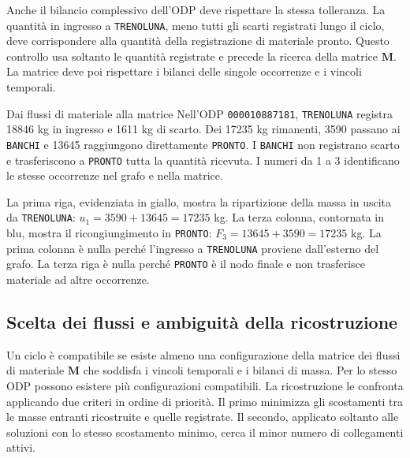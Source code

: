 Anche il bilancio complessivo dell'ODP deve rispettare la stessa tolleranza. La quantità in ingresso a \texttt{TRENOLUNA}, meno tutti gli scarti registrati lungo il ciclo, deve corrispondere alla quantità della registrazione di materiale pronto. Questo controllo usa soltanto le quantità registrate e precede la ricerca della matrice $\bm{M}$. La matrice deve poi rispettare i bilanci delle singole occorrenze e i vincoli temporali.

\begin{examplebox}{Dai flussi di materiale alla matrice}
Nell'ODP \texttt{000010887181}, \texttt{TRENOLUNA} registra \num{18846} kg in ingresso e \num{1611} kg di scarto. Dei \num{17235} kg rimanenti, \num{3590} passano ai \texttt{BANCHI} e \num{13645} raggiungono direttamente \texttt{PRONTO}. I \texttt{BANCHI} non registrano scarto e trasferiscono a \texttt{PRONTO} tutta la quantità ricevuta. I numeri da 1 a 3 identificano le stesse occorrenze nel grafo e nella matrice.

\begin{center}

\end{center}

La prima riga, evidenziata in giallo, mostra la ripartizione della massa in uscita da \texttt{TRENOLUNA}: $u_1=\num{3590}+\num{13645}=\num{17235}$ kg. La terza colonna, contornata in blu, mostra il ricongiungimento in \texttt{PRONTO}: $F_3=\num{13645}+\num{3590}=\num{17235}$ kg. La prima colonna è nulla perché l'ingresso a \texttt{TRENOLUNA} proviene dall'esterno del grafo. La terza riga è nulla perché \texttt{PRONTO} è il nodo finale e non trasferisce materiale ad altre occorrenze.
\end{examplebox}

\subsection{Scelta dei flussi e ambiguità della ricostruzione}
\label{sec:flow-selection-and-ambiguity}

Un ciclo è compatibile se esiste almeno una configurazione della matrice dei flussi di materiale $\bm{M}$ che soddisfa i vincoli temporali e i bilanci di massa. Per lo stesso ODP possono esistere più configurazioni compatibili. La ricostruzione le confronta applicando due criteri in ordine di priorità. Il primo minimizza gli scostamenti tra le masse entranti ricostruite e quelle registrate. Il secondo, applicato soltanto alle soluzioni con lo stesso scostamento minimo, cerca il minor numero di collegamenti attivi.

